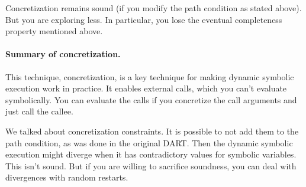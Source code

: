 \documentclass[11pt]{article}
\begin{document}
Concretization remains sound (if you modify the path condition as stated above). But you are exploring less. In particular, you lose the eventual completeness property mentioned above.

\paragraph{Summary of concretization.}
This technique, concretization, is a key technique for making dynamic symbolic execution work in practice. It enables external calls, which you can't evaluate symbolically. You can evaluate
the calls if you concretize the call arguments and just call the callee.

We talked about concretization constraints. It is possible to not add them to the path condition, as was done in the original DART. Then the dynamic symbolic execution might diverge
when it has contradictory values for symbolic variables. This isn't sound. But if you are willing to sacrifice soundness, you can deal with divergences with random restarts.



\end{document}
